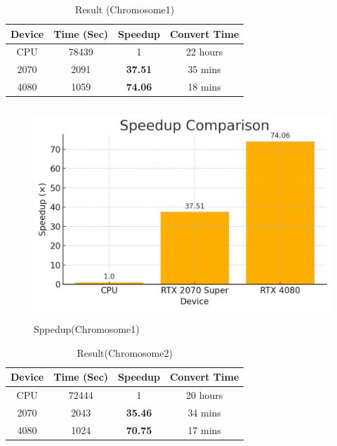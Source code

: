 \documentclass[PhD]{PHlab-thesis}
\begin{document}
\begin{table}[h]
    \centering
    \caption{Result (Chromosome1)}
    \label{tab:result1}
    \begin{tabular}{|c|c|c|c|}
     \hline
      \textbf{Device} & \textbf{Time (Sec)} &\textbf{Speedup} & \textbf{Convert Time} \\
     \hline
      CPU & 78439 & 1 & 22 hours\\
     \hline
      2070 & 2091 & \textbf{37.51} & 35 mins\\
     \hline
      4080 & 1059 & \textbf{74.06} & 18 mins\\
     \hline
    \end{tabular}
\end{table}

\begin{figure}[htbp]
    \centering
    \includegraphics[height=8cm]{figures/Result1.png}
    \caption{Sppedup(Chromosome1)}
    \label{fig:result1}
\end{figure}

\begin{table}[h]
    \centering
    \caption{Result(Chromosome2)}
    \label{tab:result2}
    \begin{tabular}{|c|c|c|c|}
     \hline
      \textbf{Device} & \textbf{Time (Sec)} &\textbf{Speedup} & \textbf{Convert Time} \\
     \hline
      CPU & 72444 & 1 & 20 hours\\
     \hline
      2070 & 2043 & \textbf{35.46} & 34 mins\\
     \hline
      4080 & 1024 & \textbf{70.75} & 17 mins\\
     \hline
    \end{tabular}
\end{table}
\end{document}
